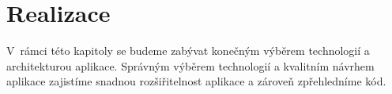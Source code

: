 \chapter{Realizace}
\label{ch:implementation}
V~rámci této kapitoly se budeme zabývat konečným výběrem technologií a architekturou aplikace. Správným výběrem technologií a kvalitním návrhem aplikace zajistíme snadnou rozšiřitelnost aplikace a zároveň zpřehledníme kód.











